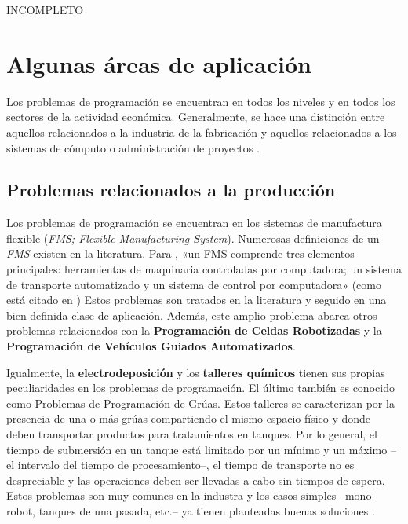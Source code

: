 \documentclass[spanish,draft,12pt,headsepline,footsepline,paper=letter]{scrreprt}
\begin{document}
INCOMPLETO

\section{Algunas áreas de aplicación}
\label{algunas_areas_aplicacion}

Los problemas de programación se encuentran en todos los niveles y en todos los sectores de la actividad económica. Generalmente, se hace una distinción entre aquellos relacionados a la industria de la fabricación y aquellos relacionados a los sistemas de cómputo o administración de proyectos \citep[p.~6]{TKindt2002}.

\subsection{Problemas relacionados a la producción} %
\label{problemas_relacionados_produccion}

Los problemas de programación se encuentran en los sistemas de manufactura flexible (\textit{FMS; Flexible Manufacturing System}). Numerosas definiciones de un \textit{FMS} existen en la literatura. Para \citet{liu1996classification}, «un FMS comprende tres elementos principales: herramientas de maquinaria controladas por computadora; un sistema de transporte automatizado y un sistema de control por computadora» (como está citado en \citealp[p.~6]{TKindt2002})  Estos problemas son tratados en la literatura y seguido en una bien definida clase de aplicación. Además, este amplio problema abarca otros problemas relacionados con la \textbf{Programación de Celdas Robotizadas} y la \textbf{Programación de Vehículos Guiados Automatizados}.

Igualmente, la \textbf{electrodeposición} y los \textbf{talleres químicos} tienen sus propias peculiaridades en los problemas de programación. El último también es conocido como Problemas de Programación de Grúas. Estos talleres se caracterizan por la presencia de una o más grúas compartiendo el mismo espacio físico y donde deben transportar productos para tratamientos en tanques. Por lo general, el tiempo de submersión en un tanque está limitado por un mínimo y un máximo –el intervalo del tiempo de procesamiento–, el tiempo de transporte no es despreciable y las operaciones deben ser llevadas a cabo sin tiempos de espera. Estos problemas son muy comunes en la industra y los casos simples –mono-robot, tanques de una pasada, etc.– ya tienen planteadas buenas soluciones \citep[p.~6,~7]{TKindt2002}.
\end{document}
